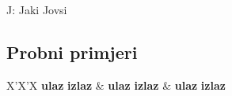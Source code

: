 \begin{statement}[
  timelimit=1 s,
  memorylimit=512 MiB,
]{J: Jaki Jovsi}
\subsection*{Probni primjeri}
\begin{tabularx}{\textwidth}{X'X'X}
  \textbf{ulaz}
  \linespread{1}{}
  \textbf{izlaz}
  \linespread{1}{} &
  \textbf{ulaz}
  \linespread{1}{}
  \textbf{izlaz}
  \linespread{1}{} &
  \textbf{ulaz}
  \linespread{1}{}
  \textbf{izlaz}
  \linespread{1}{}
\end{tabularx}

\end{statement}

